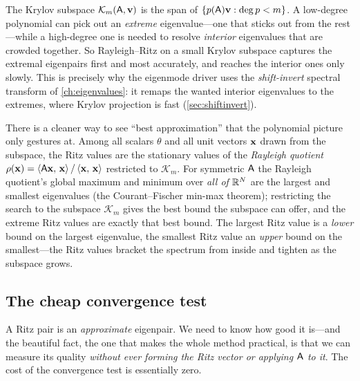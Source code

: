 \begin{keyidea}
The Krylov subspace $\mathcal{K}_m(\mathsf{A},\mathbf{v})$ is the span of $\{p(\mathsf{A})\mathbf{v} : \deg
p < m\}$. A low-degree polynomial can pick out an \emph{extreme} eigenvalue---one that
sticks out from the rest---while a high-degree one is needed to resolve \emph{interior}
eigenvalues that are crowded together. So Rayleigh--Ritz on a small Krylov subspace
captures the extremal eigenpairs first and most accurately, and reaches the interior
ones only slowly. This is precisely why the eigenmode driver uses the \emph{shift-invert}
spectral transform of \cref{ch:eigenvalues}: it remaps the wanted interior eigenvalues
to the extremes, where Krylov projection is fast (\cref{sec:shiftinvert}).
\end{keyidea}

There is a cleaner way to see ``best approximation'' that the polynomial picture only
gestures at. Among all scalars $\theta$ and all unit vectors $\mathbf{x}$ drawn from the
subspace, the Ritz values are the stationary values of the \emph{Rayleigh quotient}
$\rho(\mathbf{x}) = \left\langle \mathsf{A}\mathbf{x},\, \mathbf{x}\right\rangle / \left\langle \mathbf{x},\, \mathbf{x}\right\rangle$ restricted to $\mathcal{K}_m$.
For symmetric $\mathsf{A}$ the Rayleigh quotient's global maximum and minimum over \emph{all
of $\mathbb{R}^N$} are the largest and smallest eigenvalues (the Courant--Fischer min-max
theorem); restricting the search to the subspace $\mathcal{K}_m$ gives the best bound the
subspace can offer, and the extreme Ritz values are exactly that best bound. The largest
Ritz value is a \emph{lower} bound on the largest eigenvalue, the smallest Ritz value an
\emph{upper} bound on the smallest---the Ritz values bracket the spectrum from inside and
tighten as the subspace grows.

\subsection{The cheap convergence test}

A Ritz pair is an \emph{approximate} eigenpair. We need to know how good it is---and the
beautiful fact, the one that makes the whole method practical, is that we can measure its
quality \emph{without ever forming the Ritz vector or applying $\mathsf{A}$ to it}. The cost
of the convergence test is essentially zero.

